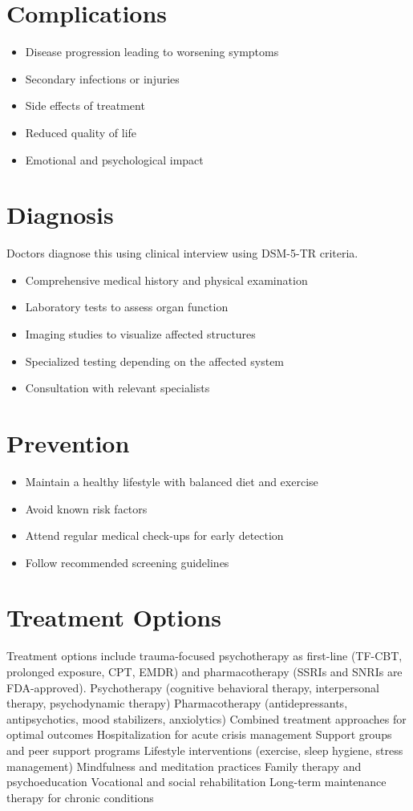 \section{Complications}
\begin{itemize}[noitemsep]
  \item Disease progression leading to worsening symptoms
  \item Secondary infections or injuries
  \item Side effects of treatment
  \item Reduced quality of life
  \item Emotional and psychological impact
\end{itemize}
\section{Diagnosis}
Doctors diagnose this using clinical interview using DSM-5-TR criteria.

\begin{itemize}[noitemsep]
  \item Comprehensive medical history and physical examination
  \item Laboratory tests to assess organ function
  \item Imaging studies to visualize affected structures
  \item Specialized testing depending on the affected system
  \item Consultation with relevant specialists
\end{itemize}
\section{Prevention}
\begin{itemize}[noitemsep]
  \item Maintain a healthy lifestyle with balanced diet and exercise
  \item Avoid known risk factors
  \item Attend regular medical check-ups for early detection
  \item Follow recommended screening guidelines
\end{itemize}
\section{Treatment Options}
Treatment options include trauma-focused psychotherapy as first-line (TF-CBT, prolonged exposure, CPT, EMDR) and pharmacotherapy (SSRIs and SNRIs are FDA-approved). Psychotherapy (cognitive behavioral therapy, interpersonal therapy, psychodynamic therapy) Pharmacotherapy (antidepressants, antipsychotics, mood stabilizers, anxiolytics) Combined treatment approaches for optimal outcomes Hospitalization for acute crisis management Support groups and peer support programs Lifestyle interventions (exercise, sleep hygiene, stress management) Mindfulness and meditation practices Family therapy and psychoeducation Vocational and social rehabilitation Long-term maintenance therapy for chronic conditions

